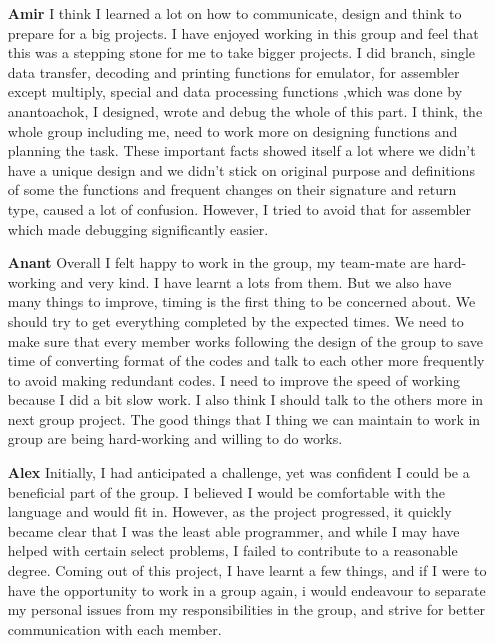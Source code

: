\documentclass[a4paper,12pt]{article}
\begin{document}
\begin{itemize}

\item[\textbf{Amir}]
I think I learned a lot on how to communicate, design and think to prepare for a big projects. I have enjoyed working in this group and feel that this was a stepping stone for me to take bigger projects. I did branch, single data transfer, decoding and printing functions for emulator, for assembler except multiply, special and data processing functions ,which was done by anantoachok, I designed, wrote and debug the whole of this part. I think, the whole group including me, need to work more on designing functions and planning the task. These important facts showed itself a lot where we didn't have a unique design and we didn't stick on original purpose and definitions of some the functions and frequent changes on their signature and return type, caused a lot of confusion. However, I tried to avoid that for assembler which made debugging significantly easier.

\item[\textbf{Anant}]
Overall I felt happy to work in the group, my team-mate are hard-working and very kind. I have learnt a lots from them. But we also have many things to improve, timing is the first thing to be concerned about. We should try to get everything completed by the expected times. We need to make sure that every member works following the design of the group to save time of converting format of the codes and talk to each other more frequently to avoid making redundant codes. I need to improve the speed of working because I did a bit slow work. I also think I should talk to the others more in next group project. The good things that I thing we can maintain to work in group are being hard-working and willing to do works.

\item[\textbf{Alex}]
Initially, I had anticipated a challenge, yet was confident I could be a beneficial part of the group. I believed I would be comfortable with the language and would fit in. However, as the project progressed, it quickly became clear that I was the least able programmer, and while I may have helped with certain select problems, I failed to contribute to a reasonable degree.
Coming out of this project, I have learnt a few things, and if I were to have the opportunity to work in a group again, i would endeavour to separate my personal issues from my responsibilities in the group, and strive for better communication with each member.


\end{itemize}
\end{document}
